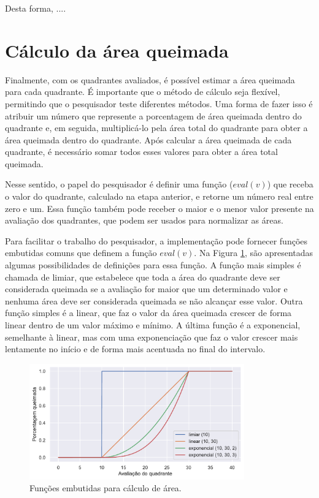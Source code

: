 \documentclass[cic,tc]{iiufrgs}
\begin{document}
Desta forma, .... \par


\section{Cálculo da área queimada}

Finalmente, com os quadrantes avaliados, é possível estimar a área queimada para cada quadrante. É importante que o método de cálculo seja flexível, permitindo que o pesquisador teste diferentes métodos. Uma forma de fazer isso é atribuir um número que represente a porcentagem de área queimada dentro do quadrante e, em seguida, multiplicá-lo pela área total do quadrante para obter a área queimada dentro do quadrante. Após calcular a área queimada de cada quadrante, é necessário somar todos esses valores para obter a área total queimada. \par

Nesse sentido, o papel do pesquisador é definir uma função ($eval(v)$) que receba o valor do quadrante, calculado na etapa anterior, e retorne um número real entre zero e um. Essa função também pode receber o maior e o menor valor presente na avaliação dos quadrantes, que podem ser usados para normalizar as áreas. \par

Para facilitar o trabalho do pesquisador, a implementação pode fornecer funções embutidas comuns que definem a função $eval(v)$. Na Figura \ref{fig:eval_func_built_in}, são apresentadas algumas possibilidades de definições para essa função. A função mais simples é chamada de limiar, que estabelece que toda a área do quadrante deve ser considerada queimada se a avaliação for maior que um determinado valor e nenhuma área deve ser considerada queimada se não alcançar esse valor. Outra função simples é a linear, que faz o valor da área queimada crescer de forma linear dentro de um valor máximo e mínimo. A última função é a exponencial, semelhante à linear, mas com uma exponenciação que faz o valor crescer mais lentamente no início e de forma mais acentuada no final do intervalo. \par

\begin{figure}[H]
    \caption{Funções embutidas para cálculo de área.}
    \begin{center}
        \includegraphics[width=25em]{eval_func_built_in}
    \end{center}
    \label{fig:eval_func_built_in}
\end{figure}
\end{document}
